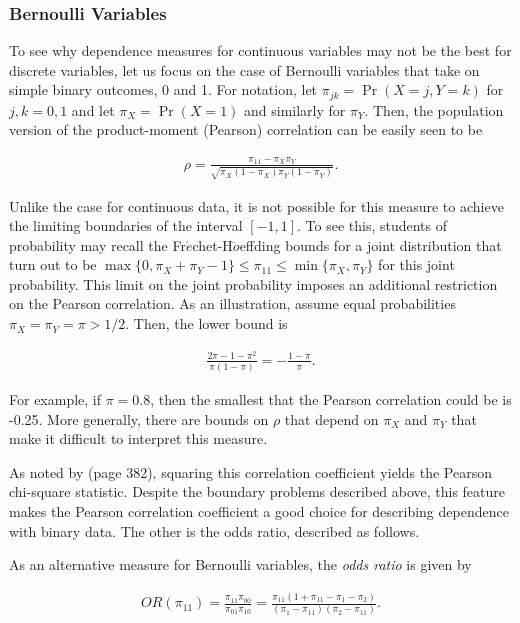 \documentclass[]{book}
\theoremstyle{definition}
\theoremstyle{definition}
\theoremstyle{definition}
\theoremstyle{remark}
\begin{document}
\subsubsection{Bernoulli Variables}\label{bernoulli-variables}

To see why dependence measures for continuous variables may not be the
best for discrete variables, let us focus on the case of Bernoulli
variables that take on simple binary outcomes, 0 and 1. For notation,
let \(\pi_{jk} = \Pr(X=j, Y=k)\) for \(j,k=0,1\) and let
\(\pi_X=\Pr(X=1)\) and similarly for \(\pi_Y\). Then, the population
version of the product-moment (Pearson) correlation can be easily seen
to be

\begin{eqnarray*}
\rho = \frac{\pi_{11} - \pi_X \pi_Y}{\sqrt{\pi_X(1-\pi_X)\pi_Y(1-\pi_Y)}} .
\end{eqnarray*}

Unlike the case for continuous data, it is not possible for this measure
to achieve the limiting boundaries of the interval \([-1,1]\). To see
this, students of probability may recall the
Fr\(\acute{e}\)chet-H\(\ddot{o}\)effding bounds for a joint distribution
that turn out to be
\(\max\{0, \pi_X+\pi_Y-1\} \le \pi_{11} \le \min\{\pi_X,\pi_Y\}\) for
this joint probability. This limit on the joint probability imposes an
additional restriction on the Pearson correlation. As an illustration,
assume equal probabilities \(\pi_X =\pi_Y = \pi > 1/2\). Then, the lower
bound is

\begin{eqnarray*}
\frac{2\pi - 1 - \pi^2}{\pi(1-\pi)} = -\frac{1-\pi}{\pi} .
\end{eqnarray*}

For example, if \(\pi=0.8\), then the smallest that the Pearson
correlation could be is -0.25. More generally, there are bounds on
\(\rho\) that depend on \(\pi_X\) and \(\pi_Y\) that make it difficult
to interpret this measure.

As noted by \citep{bishop1975discrete} (page 382), squaring this
correlation coefficient yields the Pearson chi-square statistic. Despite
the boundary problems described above, this feature makes the Pearson
correlation coefficient a good choice for describing dependence with
binary data. The other is the odds ratio, described as follows.

As an alternative measure for Bernoulli variables, the \emph{odds ratio}
is given by

\begin{eqnarray*}
OR(\pi_{11}) = \frac{\pi_{11} \pi_{00}}{\pi_{01} \pi_{10}} = \frac{\pi_{11} \left( 1+\pi_{11}-\pi_1 -\pi_2\right)}{(\pi_1-\pi_{11})(\pi_2- \pi_{11})} .
\end{eqnarray*}
\end{document}
